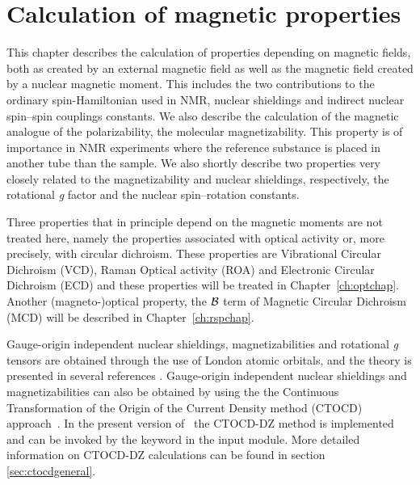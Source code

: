 \chapter{Calculation of magnetic properties}\label{ch:magnetic}

This chapter describes the calculation of properties depending on
magnetic fields, both as created by an external magnetic field as well
as the magnetic field created by a nuclear magnetic moment.
This includes the two
contributions to the ordinary spin-Hamiltonian used in NMR, nuclear
shieldings and indirect nuclear spin--spin
couplings constants. We
also describe the calculation of the magnetic analogue of the
polarizability, the molecular
magnetizability. This property
is of importance in NMR experiments where the reference substance is placed
in another tube than the sample. We also shortly describe
two properties very closely related to the magnetizability and nuclear
shieldings, respectively, the rotational {\em g} factor
and the nuclear spin--rotation constants.

Three properties that in principle depend on the %
magnetic moments are
not treated here, namely the properties associated with optical
activity or, more precisely, with circular dichroism. These
properties are Vibrational Circular Dichroism
(VCD), Raman
Optical activity (ROA) and
Electronic Circular Dichroism (ECD) and these properties will be treated in
Chapter~\ref{ch:optchap}.
Another (magneto-)optical property, the ${\cal{B}}$ term of
Magnetic Circular Dichroism (MCD) will be described in
Chapter~\ref{ch:rspchap}.

Gauge-origin
independent nuclear shieldings,
magnetizabilities and rotational {\em g} tensors are
obtained through the use of London atomic orbitals, and the theory is
presented in several references
\cite{kwjfhppjacs112,krthrkpjklbhjajjcp100,krthklbpjhjajjcp99,krthklbpjjocp195}.
Gauge-origin independent nuclear shieldings and
magnetizabilities can also be obtained by using the
the Continuous Transformation of the Origin of the Current Density method (CTOCD)
 approach~\cite{paololazz1,paololazz2,ctocd}. In the present
version of \dalton\ the CTOCD-DZ method is implemented and can be invoked by
the keyword  in the  input module.
More detailed information on CTOCD-DZ calculations can be found in section
\ref{sec:ctocdgeneral}.


